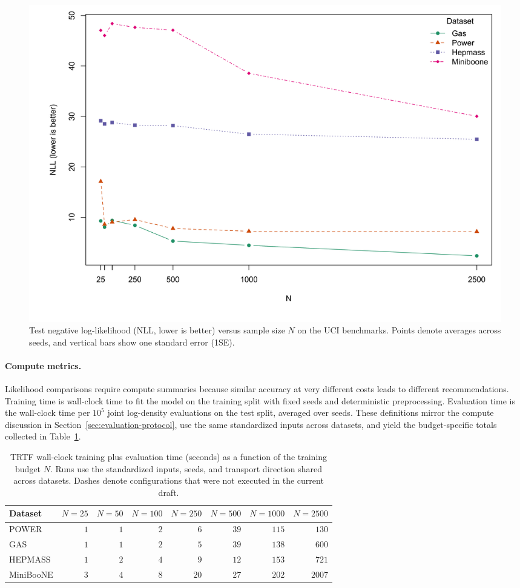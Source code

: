 \documentclass[11pt,a4paper,twoside]{book}\usepackage[]{graphicx}\usepackage[]{xcolor}
\begin{document}
\begin{figure}[htbp]
 \centering
 \includegraphics[width=0.85\linewidth]{figure/N_sensitivity_all.png}
\caption{Test negative log-likelihood (NLL, lower is better) versus sample size $N$ on the UCI benchmarks. Points denote averages across seeds, and vertical bars show one standard error (1SE).}
 \label{fig:n-sensitivity}
\end{figure}

\paragraph{Compute metrics.} Likelihood comparisons require compute summaries because similar accuracy at very different costs leads to different recommendations. Training time is wall-clock time to fit the model on the training split with fixed seeds and deterministic preprocessing. Evaluation time is the wall-clock time per $10^5$ joint log-density evaluations on the test split, averaged over seeds. These definitions mirror the compute discussion in Section~\ref{sec:evaluation-protocol}, use the same standardized inputs across datasets, and yield the budget-specific totals collected in Table~\ref{tab:real-compute}.

\begin{table}[htbp]
 \centering
 \caption{TRTF wall-clock training plus evaluation time (seconds) as a function of the training budget $N$. Runs use the standardized inputs, seeds, and transport direction shared across datasets. Dashes denote configurations that were not executed in the current draft.}
 \label{tab:real-compute}
 \begin{tabular}{lrrrrrrr}
 \hline
 Dataset & $N=25$ & $N=50$ & $N=100$ & $N=250$ & $N=500$ & $N=1000$ & $N=2500$ \\
 \hline
 POWER & $1$ & $1$ & $2$ & $6$ & $39$ & $115$ & $130$ \\
 GAS & $1$ & $1$ & $2$ & $5$ & $39$ & $138$ & $600$ \\
 HEPMASS & $1$ & $2$ & $4$ & $9$ & $12$ & $153$ & $721$ \\
 MiniBooNE & $3$ & $4$ & $8$ & $20$ & $27$ & $202$ & $2007$ \\
 \hline
 \end{tabular}
\end{table}
\end{document}
